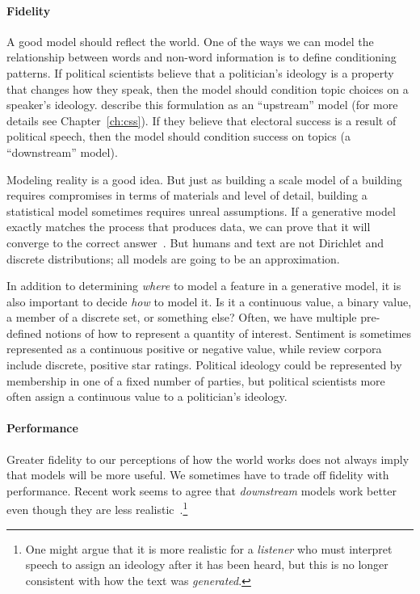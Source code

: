 \paragraph{Fidelity}

A good model should reflect the world. One of the ways we can model the relationship between words and non-word information is to define conditioning patterns.
If political scientists believe that a politician's ideology is a property that changes how they speak, then the model should condition topic choices on a speaker's ideology.
\citet{mimno-08} describe this formulation as an ``upstream'' model (for more details see Chapter~\ref{ch:css}).
If they believe that electoral success is a result of political speech, then the model should condition success on topics (a ``downstream'' model).

Modeling reality is a good idea. But just as building a scale model of
a building requires compromises in terms of materials and level of
detail, building a statistical model sometimes requires unreal assumptions.
If a generative model exactly
matches the process that produces data, we can prove that it will
converge to the correct answer~\citep{neal-93}.
But humans and text are
not Dirichlet and discrete distributions; all models are going to
be an approximation.

In addition to determining \emph{where} to model a feature in a
generative model, it is also important to decide \emph{how} to model
it.  Is it a continuous value, a binary value, a member of a discrete
set, or something else?  Often, we have multiple pre-defined notions of how to
represent a quantity of interest.
Sentiment is sometimes represented as a continuous positive or negative value, while review corpora include discrete, positive star ratings.
Political ideology could be represented by membership in one of a fixed number of
parties, but political scientists more often assign a continuous value to a
politician's ideology.

\paragraph{Performance}

Greater fidelity to our perceptions of how the world works does not always imply that models will be more  useful.
We sometimes have to trade off fidelity with performance.
Recent work seems to agree that \emph{downstream} models work better even though they are
less realistic~\citep{nguyen-13:shlda}.\footnote{One might argue that it is more realistic for
  a \emph{listener} who must interpret speech to assign an ideology
  after it has been heard, but this is no longer consistent with how
  the text was \emph{generated}.} 

